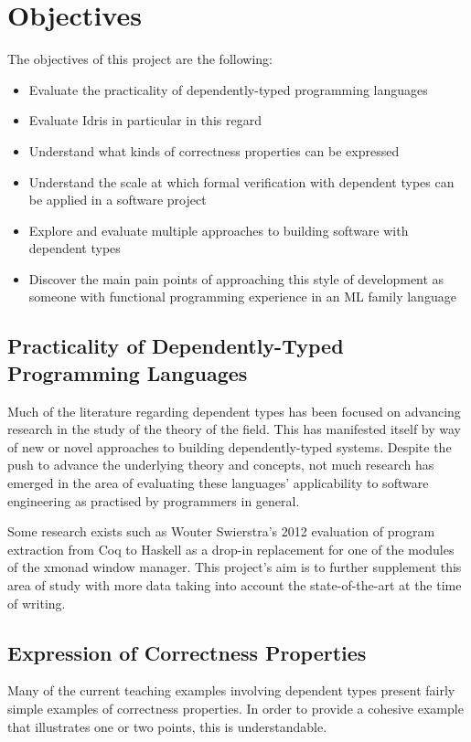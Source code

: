 \documentclass[a4paper, notitlepage]{report}
\begin{document}
\section{Objectives \label{sec-objectives}}
\label{sec:org6904a04}
The objectives of this project are the following:
\begin{itemize}
\item Evaluate the practicality of dependently-typed programming languages
\item Evaluate Idris in particular in this regard
\item Understand what kinds of correctness properties can be expressed
\item Understand the scale at which formal verification with dependent types can be
applied in a software project
\item Explore and evaluate multiple approaches to building software with dependent
types
\item Discover the main pain points of approaching this style of development as
someone with functional programming experience in an ML family language
\end{itemize}

\subsection{Practicality of Dependently-Typed Programming Languages}
\label{sec:orga23fe5b}
Much of the literature regarding dependent types has been focused on advancing
research in the study of the theory of the field. This has manifested itself by
way of new or novel approaches to building dependently-typed systems. Despite
the push to advance the underlying theory and concepts, not much research has
emerged in the area of evaluating these languages' applicability to software
engineering as practised by programmers in general.

Some research exists such as Wouter Swierstra's 2012 evaluation
\cite{swierstra_xmonad_2012} of program extraction from Coq to Haskell as a
drop-in replacement for one of the modules of the xmonad window manager. This
project's aim is to further supplement this area of study with more data taking
into account the state-of-the-art at the time of writing.

\subsection{Expression of Correctness Properties}
\label{sec:orgd2a669e}
Many of the current teaching examples involving dependent types present fairly
simple examples of correctness properties. In order to provide a cohesive
example that illustrates one or two points, this is understandable.
\end{document}

